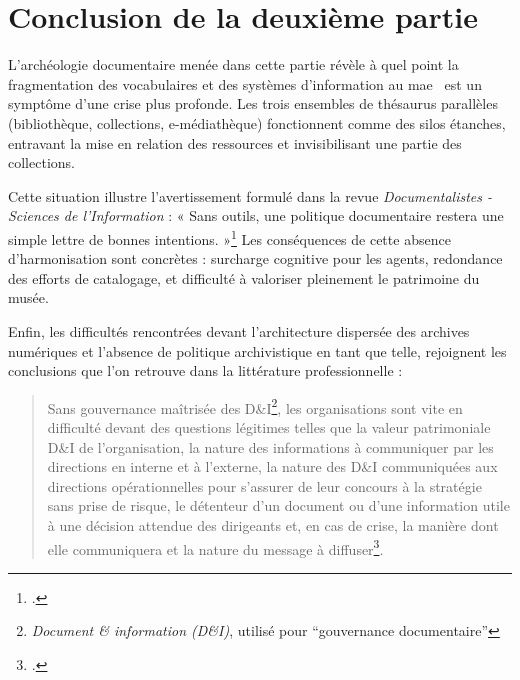 \documentclass[12pt,twoside]{book}
\newcommand{\mae}{\ac{mae}} %
\begin{document}
	\bigskip
	\section*{Conclusion de la deuxième partie}
	
	\lettrine{L}{'}archéologie documentaire menée dans cette partie révèle à quel point la fragmentation des vocabulaires et des systèmes d'information au \mae~ est un symptôme d'une crise plus profonde. Les trois ensembles de thésaurus parallèles (bibliothèque, collections, e-médiathèque) fonctionnent comme des silos étanches, entravant la mise en relation des ressources et invisibilisant une partie des collections.
	
	
	
	Cette situation illustre l'avertissement formulé dans la revue \textit{Documentalistes - Sciences de l’Information} : « Sans outils, une politique documentaire restera une simple lettre de bonnes intentions. »\footcite{GouvernanceLinformationPerspectives2013} Les conséquences de cette absence d'harmonisation sont concrètes : surcharge cognitive pour les agents, redondance des efforts de catalogage, et difficulté à valoriser pleinement le patrimoine du musée.
	
	
	
	Enfin, les difficultés rencontrées devant l'architecture dispersée des archives numériques et l'absence de politique archivistique en tant que telle, rejoignent les conclusions que l'on retrouve dans la littérature professionnelle : 
	
	\begin{quote}
		
		\og Sans gouvernance maîtrisée des D\&I\footnote{\textit{Document \& information (D\&I)}, utilisé pour \enquote{gouvernance documentaire}}, les organisations sont vite en difficulté devant des questions légitimes telles que la valeur patrimoniale D\&I de l’organisation, la nature des informations à communiquer par les directions en interne et à l’externe, la nature des D\&I communiquées aux directions opérationnelles pour s’assurer de leur concours à la stratégie sans prise de risque, le détenteur d’un document ou d’une information utile à une décision attendue des dirigeants et, en cas de crise, la manière dont elle communiquera et la nature du message à diffuser\footcite{GouvernanceLinformationPerspectives2013}.\fg
		
	\end{quote}
	
\end{document}
